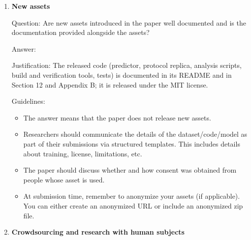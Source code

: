 \documentclass[
]{article}
\begin{document}
\begin{enumerate}
  \begin{itemize}
  \item
    The answer \answerNA{} means that the paper does not use existing
    assets.
  \item
    The authors should cite the original paper that produced the code
    package or dataset.
  \item
    The authors should state which version of the asset is used and, if
    possible, include a URL.
  \item
    The name of the license (e.g., CC-BY 4.0) should be included for
    each asset.
  \item
    For scraped data from a particular source (e.g., website), the
    copyright and terms of service of that source should be provided.
  \item
    If assets are released, the license, copyright information, and
    terms of use in the package should be provided. For popular
    datasets,
    \href{https://paperswithcode.com/datasets}{paperswithcode.com/datasets}
    has curated licenses for some datasets. Their licensing guide can
    help determine the license of a dataset.
  \item
    For existing datasets that are re-packaged, both the original
    license and the license of the derived asset (if it has changed)
    should be provided.
  \item
    If this information is not available online, the authors are
    encouraged to reach out to the asset's creators.
  \end{itemize}
\item
  \textbf{New assets}

  Question: Are new assets introduced in the paper well documented and
  is the documentation provided alongside the assets?

  Answer: \answerYes{}

  Justification: The released code (predictor, protocol replica,
  analysis scripts, build and verification tools, tests) is documented
  in its README and in Section 12 and Appendix B; it is released under
  the MIT license.

  Guidelines:

  \begin{itemize}
  \item
    The answer \answerNA{} means that the paper does not release new
    assets.
  \item
    Researchers should communicate the details of the dataset/code/model
    as part of their submissions via structured templates. This includes
    details about training, license, limitations, etc.
  \item
    The paper should discuss whether and how consent was obtained from
    people whose asset is used.
  \item
    At submission time, remember to anonymize your assets (if
    applicable). You can either create an anonymized URL or include an
    anonymized zip file.
  \end{itemize}
\item
  \textbf{Crowdsourcing and research with human subjects}


\end{enumerate}
\end{document}
